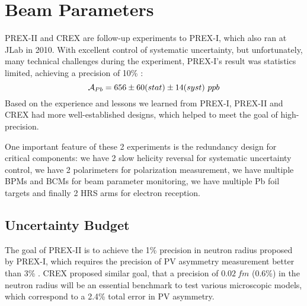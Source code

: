 \section{Beam Parameters}
PREX-II and CREX are follow-up experiments to PREX-I, which also ran at JLab in 2010. 
With excellent control of systematic uncertainty, but unfortunately, 
many technical challenges during the experiment, PREX-I's result was statistics 
limited, achieving a precision of 10\% \cite{PhysRevLett.108.112502}:
$$ \CA_{Pb} = 656 \pm 60 (stat) \pm 14 (syst) \ ppb$$
Based on the experience and lessons we learned from PREX-I, 
PREX-II and CREX had more well-established designs, which helped to
meet the goal of high-precision.

One important feature of these 2 experiments is the redundancy design for critical
components: we have 2 slow helicity reversal for systematic uncertainty control,
we have 2 polarimeters for polarization measurement, we have multiple BPMs and
BCMs for beam parameter monitoring, we have multiple Pb foil targets and finally
2 HRS arms for electron reception.

\subsection{Uncertainty Budget}
The goal of PREX-II is to achieve the 1\% precision in \Pb neutron radius proposed
by PREX-I, which requires the precision of PV asymmetry measurement better than 3\% \cite{PhysRevLett.106.252501}. 
CREX proposed similar goal, that a precision of $0.02 \ fm$ (0.6\%) in the
\Ca neutron radius will be an essential benchmark to test various microscopic 
models, which correspond to a 2.4\% total error in PV asymmetry.

